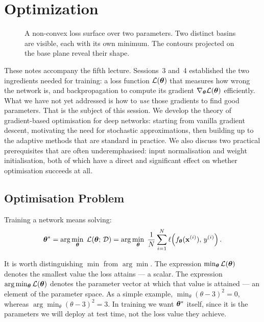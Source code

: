\section{Optimization}

\begin{figure}
\centering
\vspace{-0.5em}
\resizebox{0.43\textwidth}{!}{}
\caption{A non-convex loss surface over two parameters. Two distinct basins are visible, each with its own minimum. The contours projected on the base plane reveal their shape.}
\label{fig:loss_landscape_3d}
\end{figure}
These notes accompany the fifth lecture. Sessions~3 and~4 established the two ingredients needed for training: a loss function $\mathcal{L}(\boldsymbol{\theta})$ that measures how wrong the network is, and backpropagation to compute its gradient $\nabla_{\boldsymbol{\theta}}\mathcal{L}(\boldsymbol{\theta})$ efficiently. What we have not yet addressed is how to \emph{use} those gradients to find good parameters. That is the subject of this session. We develop the theory of gradient-based optimisation for deep networks: starting from vanilla gradient descent, motivating the need for stochastic approximations, then building up to the adaptive methods that are standard in practice. We also discuss two practical prerequisites that are often underemphasised: input normalisation and weight initialisation, both of which have a direct and significant effect on whether optimisation succeeds at all.

\subsection{Optimisation Problem}


Training a network means solving:
\begin{equation}
    \boldsymbol{\theta}^* = \arg\min_{\boldsymbol{\theta}}\; \mathcal{L}(\boldsymbol{\theta};\, \mathcal{D})
    = \arg\min_{\boldsymbol{\theta}}\; \frac{1}{N} \sum_{i=1}^{N} \ell\!\left(f_{\boldsymbol{\theta}}(\mathbf{x}^{(i)}),\, y^{(i)}\right).
\end{equation}

\begin{remark}
    It is worth distinguishing $\min$ from $\arg\min$. The expression $\min_{\boldsymbol{\theta}} \mathcal{L}(\boldsymbol{\theta})$ denotes the smallest value the loss attains — a scalar. The expression $\arg\min_{\boldsymbol{\theta}} \mathcal{L}(\boldsymbol{\theta})$ denotes the parameter vector at which that value is attained — an element of the parameter space. As a simple example, $\min_{\theta}(\theta - 3)^2 = 0$, whereas $\arg\min_{\theta}(\theta - 3)^2 = 3$. In training we want $\boldsymbol{\theta}^*$ itself, since it is the parameters we will deploy at test time, not the loss value they achieve.
\end{remark}

